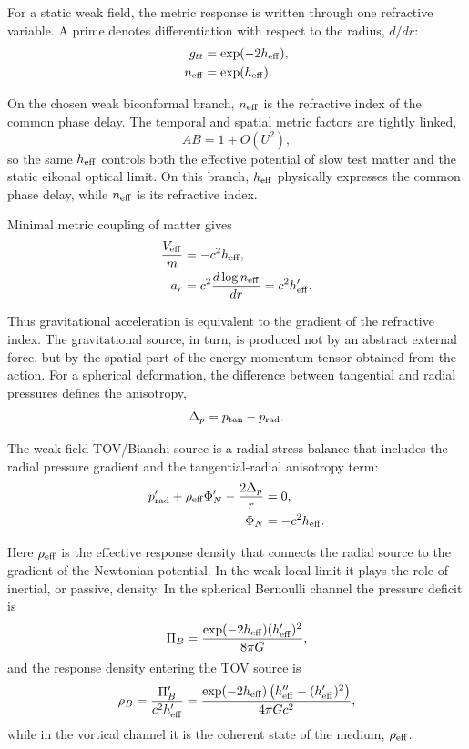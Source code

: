 \documentclass[12pt]{article}
\begin{document}
For a static weak field, the metric response is written through one refractive variable. A prime denotes differentiation with respect to the radius, $d/dr$:
\begin{align}
g_{tt} &= \exp(-2h_{\rm eff}), \\
n_{\rm eff} &= \exp(h_{\rm eff}) .
\end{align}

On the chosen weak biconformal branch, $n_{\rm eff}$ is the refractive index of the common phase delay. The temporal and spatial metric factors are tightly linked,
\begin{equation}
AB=1+O(U^2),
\end{equation}
so the same $h_{\rm eff}$ controls both the effective potential of slow test matter and the static eikonal optical limit. On this branch, $h_{\rm eff}$ physically expresses the common phase delay, while $n_{\rm eff}$ is its refractive index.

Minimal metric coupling of matter gives
\begin{align}
\frac{V_{\rm eff}}{m} &= -c^2h_{\rm eff}, \\
a_r &= c^2\frac{d\log n_{\rm eff}}{dr}
     = c^2 h_{\rm eff}' .
\end{align}

Thus gravitational acceleration is equivalent to the gradient of the refractive index. The gravitational source, in turn, is produced not by an abstract external force, but by the spatial part of the energy-momentum tensor obtained from the action. For a spherical deformation, the difference between tangential and radial pressures defines the anisotropy,
\begin{equation}
\Delta_p=p_{\rm tan}-p_{\rm rad}.
\end{equation}

The weak-field TOV/Bianchi source is a radial stress balance that includes the radial pressure gradient and the tangential-radial anisotropy term:
\begin{align}
p_{\rm rad}' + \rho_{\rm eff}\Phi_N' - \frac{2\Delta_p}{r} &= 0, \\
\Phi_N &= -c^2h_{\rm eff}.
\end{align}

Here $\rho_{\rm eff}$ is the effective response density that connects the radial source to the gradient of the Newtonian potential. In the weak local limit it plays the role of inertial, or passive, density. In the spherical Bernoulli channel the pressure deficit is
\begin{equation}
\Pi_B=\frac{\exp(-2h_{\rm eff})(h_{\rm eff}')^2}{8\pi G},
\end{equation}
and the response density entering the TOV source is
\begin{equation}
\rho_B=\frac{\Pi_B'}{c^2h_{\rm eff}'}
=\frac{\exp(-2h_{\rm eff})\left(h_{\rm eff}''-(h_{\rm eff}')^2\right)}
{4\pi Gc^2},
\end{equation}
while in the vortical channel it is the coherent state of the medium, $\rho_{\rm eff}$.
\end{document}
